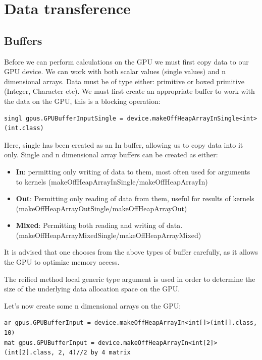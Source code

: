 \documentclass[conc-doc]{subfiles}
\begin{document}
\section{Data transference}
\subsection{Buffers}
Before we can perform calculations on the GPU we must first copy data to our GPU device. We can work with both scalar values (single values) and n dimensional arrays. Data must be of type either: primitive or boxed primitive (Integer, Character etc). We must first create an appropriate buffer to work with the data on the GPU, this is a blocking operation:

\begin{lstlisting}
singl gpus.GPUBufferInputSingle = device.makeOffHeapArrayInSingle<int>(int.class)
\end{lstlisting}

Here, single has been created as an In buffer, allowing us to copy data into it only. Single and n dimensional array buffers can be created as either:

\begin{itemize}
	\item \textbf{In}: permitting only writing of data to them, most often used for arguments to kernels (makeOffHeapArrayInSingle/makeOffHeapArrayIn)
	\item \textbf{Out}: Permitting only reading of data from them, useful for results of kernels (makeOffHeapArrayOutSingle/makeOffHeapArrayOut)
	\item \textbf{Mixed}: Permitting both reading and writing of data. (makeOffHeapArrayMixedSingle/makeOffHeapArrayMixed)
\end{itemize}  

It is advised that one chooses from the above types of buffer carefully, as it allows the GPU to optimize memory access.

The reified method local generic type argument is used in order to determine the size of the underlying data allocation space on the GPU.

Let's now create some n dimensional arrays on the GPU:

\begin{lstlisting}
ar gpus.GPUBufferInput = device.makeOffHeapArrayIn<int[]>(int[].class, 10)
mat gpus.GPUBufferInput = device.makeOffHeapArrayIn<int[2]>(int[2].class, 2, 4)//2 by 4 matrix
\end{lstlisting}
\end{document}
